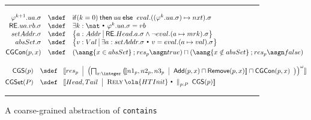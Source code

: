 \documentclass{article}
\makeatletter
\def \reachable{{\sf RE}}
\newcommand{\AG}[1]{\aang{#1}}
\newcommand{\st}{~{\scriptscriptstyle ^\bullet}~}
\def\figrule{\rule{\columnwidth}{0.5pt}}
\def \rely {\mathop{\textsc{Rely}}}
\theoremstyle{plain}
\theoremstyle{definition}
\def \llb {\llbracket}
\def \rrb {\rrbracket}
\newcommand{\Context}[2]
{\!\llb #1 
    \begin{array}[c]{@{~~}|@{~~}l@{}}
      #2
    \end{array}\rrb } \newcommand{\Var}[2]{\textsc{Var}~#1 \st #2}
\newcommand{\Par}{\textstyle\mathop{\|}}
\def\ch{\mathbin{;}}
\def \kif{\mathop{\mathsf{if}}}
\def \kthen{\mathbin{\mathsf{then}}}
\def \kelse{\mathbin{\mathsf{else}}}
\makeatother
\begin{document}
\begin{figure}[!t]
  \centering
  \figrule\small

    $\begin{array}[t]{@{}rcl@{}}
      \varphi^{k+1}.ua.\sigma &\sdef& 
      \begin{array}[t]{@{}l@{}}
      \kif (k = 0) \kthen 
      ua       \kelse\ 
      eval.((\varphi^k.ua.\sigma) \mapsto nxt).\sigma
    \end{array}
      \\
      \reachable.ua.vb.\sigma &\sdef&  \exists k : \nat \st
      \varphi^k.ua.\sigma = vb
      \\
      setAddr.\sigma & \sdef & \left\{a :
      Addr 
      \begin{array}[c]{@{~}|@{~}l@{}}
        \reachable.Head.a.\sigma  \land 
        \neg eval.(a\mapsto mrk).\sigma
      \end{array}
    \right\} 
      \\
      absSet.\sigma & \sdef & \left\{v :
      Val 
      \begin{array}[c]{@{~}|@{~}l@{}}
        \exists a : setAddr.\sigma \st 
        \hfill v = eval.(a \mapsto
        val).\sigma
      \end{array}
    \right\} 
      \smallskip\\
      \mathsf{CGCon}(p,x) & \sdef &
      \begin{array}[t]{@{}rl@{}}
        (\AG{x \in absSet} \ch res_p \asgn true )
        \sqcap  {}
        (\AG{x \notin absSet} \ch res_p \asgn false)
      \end{array}
    \end{array}$
    \smallskip
  
    $\begin{array}[t]{@{}rcl@{}} 
      \mathsf{CGS}(p) & \sdef &
      \Context{res_p}{\left( \bigsqcap_{x : \integer} \left(
            \begin{array}[c]{@{}ll@{}}
              
              \Context{
                \begin{array}[c]{@{}r@{}}
                  n1_p, n2_p, n3_p
                \end{array}
              }{
                \mathsf{Add}(p,x) 
                \sqcap
                \mathsf{Remove}(p,x)}
              {}\sqcap   \mathsf{CGCon}(p,x)
            \end{array}
          \right) \right)^{\omega}}
      \smallskip \\
      \mathsf{CGSet}(P) & \sdef & \Context{Head,Tail}{\rely
        \ola{HTInit} \st \Par_{p:P}\ 
        \mathsf{CGS}(p)}
    \end{array}$
    \figrule
  \caption{A coarse-grained abstraction of {\tt contains}}
  \label{fig:labs}
\end{figure}
\end{document}
